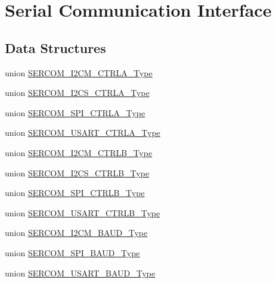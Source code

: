 \hypertarget{group___s_a_m_d21___s_e_r_c_o_m}{}\section{Serial Communication Interface}
\label{group___s_a_m_d21___s_e_r_c_o_m}
\subsection*{Data Structures}
\begin{DoxyCompactItemize}
\item 
union \mbox{\hyperlink{union_s_e_r_c_o_m___i2_c_m___c_t_r_l_a___type}{S\+E\+R\+C\+O\+M\+\_\+\+I2\+C\+M\+\_\+\+C\+T\+R\+L\+A\+\_\+\+Type}}
\item 
union \mbox{\hyperlink{union_s_e_r_c_o_m___i2_c_s___c_t_r_l_a___type}{S\+E\+R\+C\+O\+M\+\_\+\+I2\+C\+S\+\_\+\+C\+T\+R\+L\+A\+\_\+\+Type}}
\item 
union \mbox{\hyperlink{union_s_e_r_c_o_m___s_p_i___c_t_r_l_a___type}{S\+E\+R\+C\+O\+M\+\_\+\+S\+P\+I\+\_\+\+C\+T\+R\+L\+A\+\_\+\+Type}}
\item 
union \mbox{\hyperlink{union_s_e_r_c_o_m___u_s_a_r_t___c_t_r_l_a___type}{S\+E\+R\+C\+O\+M\+\_\+\+U\+S\+A\+R\+T\+\_\+\+C\+T\+R\+L\+A\+\_\+\+Type}}
\item 
union \mbox{\hyperlink{union_s_e_r_c_o_m___i2_c_m___c_t_r_l_b___type}{S\+E\+R\+C\+O\+M\+\_\+\+I2\+C\+M\+\_\+\+C\+T\+R\+L\+B\+\_\+\+Type}}
\item 
union \mbox{\hyperlink{union_s_e_r_c_o_m___i2_c_s___c_t_r_l_b___type}{S\+E\+R\+C\+O\+M\+\_\+\+I2\+C\+S\+\_\+\+C\+T\+R\+L\+B\+\_\+\+Type}}
\item 
union \mbox{\hyperlink{union_s_e_r_c_o_m___s_p_i___c_t_r_l_b___type}{S\+E\+R\+C\+O\+M\+\_\+\+S\+P\+I\+\_\+\+C\+T\+R\+L\+B\+\_\+\+Type}}
\item 
union \mbox{\hyperlink{union_s_e_r_c_o_m___u_s_a_r_t___c_t_r_l_b___type}{S\+E\+R\+C\+O\+M\+\_\+\+U\+S\+A\+R\+T\+\_\+\+C\+T\+R\+L\+B\+\_\+\+Type}}
\item 
union \mbox{\hyperlink{union_s_e_r_c_o_m___i2_c_m___b_a_u_d___type}{S\+E\+R\+C\+O\+M\+\_\+\+I2\+C\+M\+\_\+\+B\+A\+U\+D\+\_\+\+Type}}
\item 
union \mbox{\hyperlink{union_s_e_r_c_o_m___s_p_i___b_a_u_d___type}{S\+E\+R\+C\+O\+M\+\_\+\+S\+P\+I\+\_\+\+B\+A\+U\+D\+\_\+\+Type}}
\item 
union \mbox{\hyperlink{union_s_e_r_c_o_m___u_s_a_r_t___b_a_u_d___type}{S\+E\+R\+C\+O\+M\+\_\+\+U\+S\+A\+R\+T\+\_\+\+B\+A\+U\+D\+\_\+\+Type}}

\end{DoxyCompactItemize}
